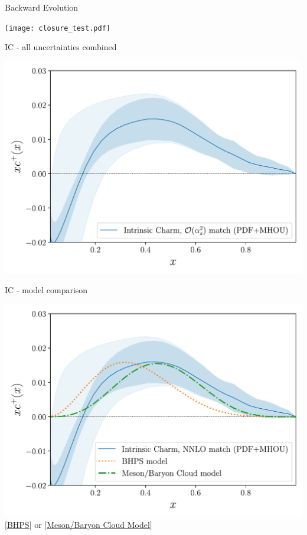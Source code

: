 \documentclass[9pt]{beamer}
\providecommand{\iRef}[1]{{\color{mLightGreen}\small $[$#1$]$}}
\begin{document}
\begin{frame}{\eko{} Backward Evolution}
	\begin{center}
		\texttt{[image: closure\_test.pdf]}
	\end{center}
\end{frame}

\begin{frame}{IC - all uncertainties combined}
	\begin{center}
		\includegraphics[width=\linewidth]{3fns_Quad_MHOU.pdf}
	\end{center}
\end{frame}
\begin{frame}{IC - model comparison}
	\begin{center}
		\includegraphics[width=.9\linewidth]{nf3_to_models.pdf}\\
		\iRef{\href{https://doi.org/10.1016/0370-2693(80)90364-0}{BHPS}} or \iRef{\href{https://doi.org/10.1103/PhysRevD.89.074008}{Meson/Baryon Cloud Model}}
	\end{center}
\end{frame}
\end{document}
